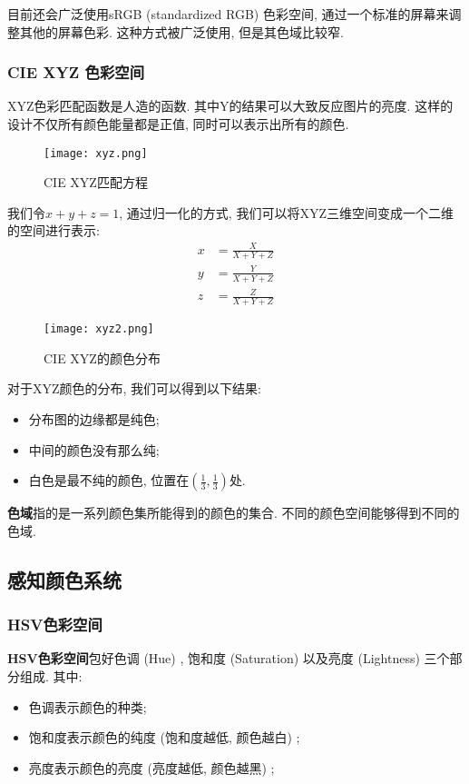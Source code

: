 \documentclass[openany]{progbookcn}
\begin{document}
目前还会广泛使用sRGB (standardized RGB) 色彩空间, 通过一个标准的屏幕来调整其他的屏幕色彩. 这种方式被广泛使用, 但是其色域比较窄. 

\subsubsection{CIE XYZ 色彩空间}

XYZ色彩匹配函数是人造的函数. 其中Y的结果可以大致反应图片的亮度. 这样的设计不仅所有颜色能量都是正值, 同时可以表示出所有的颜色. 

\begin{figure}[H]
	\centering
	\texttt{[image: xyz.png]}
	\caption{CIE XYZ匹配方程}
	\label{fig:xyz}
\end{figure}

我们令$x+y+z=1$, 通过归一化的方式, 我们可以将XYZ三维空间变成一个二维的空间进行表示: 
\begin{equation}
	\begin{split}
		x &=\frac{X}{X+Y+Z} \\
		y &=\frac{Y}{X+Y+Z} \\
		z &=\frac{Z}{X+Y+Z}
	\end{split}
\end{equation}

\begin{figure}[H]
	\centering
	\texttt{[image: xyz2.png]}
	\caption{CIE XYZ的颜色分布}
	\label{fig:xyz2}
\end{figure}

对于XYZ颜色的分布, 我们可以得到以下结果: 
\begin{itemize}
	\item 分布图的边缘都是纯色; 
	\item 中间的颜色没有那么纯; 
	\item 白色是最不纯的颜色, 位置在$(\frac{1}{3},\frac{1}{3})$处. 
\end{itemize}

\textbf{色域}指的是一系列颜色集所能得到的颜色的集合. 不同的颜色空间能够得到不同的色域. 

\subsection{感知颜色系统}

\subsubsection{HSV色彩空间}

\textbf{HSV色彩空间}包好色调 (Hue) , 饱和度 (Saturation) 以及亮度 (Lightness) 三个部分组成. 其中: 
\begin{itemize}
	\item 色调表示颜色的种类; 
	\item 饱和度表示颜色的纯度 (饱和度越低, 颜色越白) ; 
	\item 亮度表示颜色的亮度 (亮度越低, 颜色越黑) ; 
\end{itemize}
\end{document}
